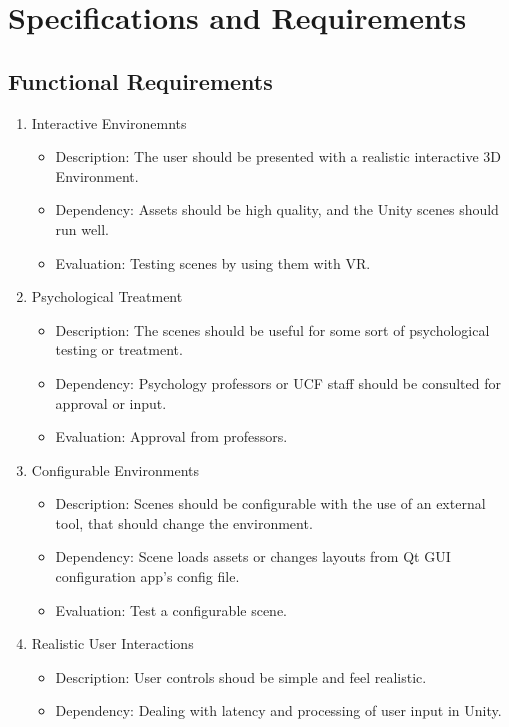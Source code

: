 \documentclass[a4paper,10pt]{article}
\begin{document}
	
	
	\pagebreak
\section{Specifications and Requirements}
	\subsection{Functional Requirements}
	\begin{enumerate}
		\item Interactive Environemnts
		\begin{itemize}
		 \item Description: The user should be presented with a realistic interactive 3D Environment. 
		 \item Dependency: Assets should be high quality, and the Unity scenes should run well.
		 \item Evaluation: Testing scenes by using them with VR.
		\end{itemize}
		\item Psychological Treatment
		\begin{itemize}
		 \item Description: The scenes should be useful for some sort of psychological testing or treatment.
		 \item Dependency:  Psychology professors or UCF staff should be consulted for approval or input.
		 \item Evaluation:  Approval from professors. 
		\end{itemize}
		\item Configurable Environments
		\begin{itemize} 
		 \item Description: Scenes should be configurable with the use of an external tool, that should change the environment. 
		 \item Dependency:  Scene loads assets or changes layouts from Qt GUI configuration app's config file. 
		 \item Evaluation:  Test a configurable scene.
		\end{itemize}
		\item Realistic User Interactions
		\begin{itemize}
		 \item Description: User controls shoud be simple and feel realistic. 
		 \item Dependency:  Dealing with latency and processing of user input in Unity. 

\end{itemize}
\end{enumerate}
\end{document}
